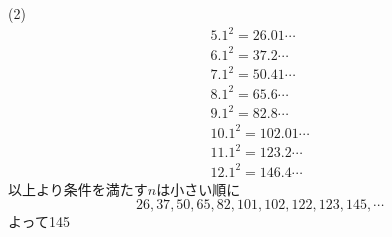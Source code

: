 \documentclass[12pt,a4j]{jarticle}
\begin{document}
(2)
\begin{align*}
5.1^2=26.01\cdots
\\6.1^2=37.2\cdots
\\7.1^2=50.41\cdots
\\8.1^2=65.6\cdots
\\9.1^2=82.8\cdots
\\10.1^2=102.01\cdots
\\11.1^2=123.2\cdots
\\12.1^2=146.4\cdots
\end{align*}
以上より条件を満たす$n$は小さい順に
$$
26,37,50,65,82,101,102,122,123,145,\cdots
$$
よって145
\end{document}
